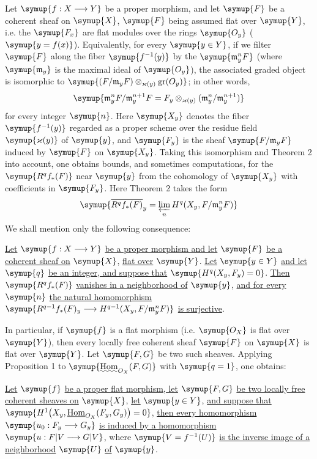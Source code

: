 Let $\symup{f:X\longrightarrow Y}$ be a proper morphism, and let $\symup{F}$ be a coherent
sheaf on $\symup{X}$, 
$\symup{F}$ being assumed flat over $\symup{Y}$, i.e. the $\symup{F_x}$ are flat modules over the
rings $\symup{O_y}$ ($\symup{y=f(x)}$). Equivalently, for every $\symup{y\in Y}$, if we filter $\symup{F}$
along the fiber $\symup{f^{-1}(y)}$ by the $\symup{\mathfrak m_y^nF}$ (where
$\symup{\mathfrak m_y}$ is the maximal ideal of $\symup{O_y}$), the associated graded
object is isomorphic to
$\symup{(F/\mathfrak m_yF)\otimes_{\varkappa(y)}\operatorname{gr}(O_y)}$; in other
words,
\[
  \symup{\mathfrak m_y^nF/\mathfrak m_y^{n+1}F
  =F_y\otimes_{\varkappa(y)}
  (\mathfrak m_y^n/\mathfrak m_y^{n+1})}
\]
for every integer $\symup{n}$. Here $\symup{X_y}$ denotes the fiber $\symup{f^{-1}(y)}$ regarded as a
proper scheme over the residue field $\symup{\varkappa(y)}$ of $\symup{y}$, and $\symup{F_y}$ is the
sheaf $\symup{F/\mathfrak m_yF}$ induced by $\symup{F}$ on $\symup{X_y}$. Taking this isomorphism and
Theorem 2 into account, one obtains bounds, and sometimes computations, for
the $\symup{R^qf_*(F)}$ near $\symup{y}$ from the cohomology of $\symup{X_y}$ with coefficients in
$\symup{F_y}$. Here Theorem 2 takes the form
\[
  \symup{\overline{R^qf_*(F)}_y
  =\varprojlim\limits_n H^q(X_y,F/\mathfrak m_y^nF)}
\]
We shall mention only the following consequence:


 \uline{Let} $\symup{f:X\longrightarrow Y}$ \uline{be a proper morphism and
let} $\symup{F}$ \uline{be a coherent sheaf on} $\symup{X}$, \uline{flat over} $\symup{Y}$. \uline{Let} $\symup{y\in Y}$ \uline{and let} $\symup{q}$
\uline{be an integer, and suppose that} $\symup{H^q(X_y,F_y)=0}$. \uline{Then} $\symup{R^qf_*(F)}$ \uline{vanishes in
a neighborhood of} $\symup{y}$, \uline{and for every} $\symup{n}$ \uline{the natural homomorphism}
$\symup{R^{q-1}f_*(F)_y\longrightarrow H^{q-1}(X_y,F/\mathfrak m_y^nF)}$
\uline{is surjective}.

In particular, if $\symup{f}$ is a flat morphism (i.e. $\symup{O_X}$ is flat over $\symup{Y}$),
then every locally free coherent sheaf $\symup{F}$ on $\symup{X}$ is flat over $\symup{Y}$. Let $\symup{F,G}$
be two such sheaves. Applying Proposition 1 to
$\symup{\mathop{\text{\uwave{Hom}}}\nolimits_{O_X}(F,G)}$ with $\symup{q=1}$, one obtains:

 \uline{Let} $\symup{f}$ \uline{be a proper flat morphism, let} $\symup{F,G}$ \uline{be two
locally free coherent sheaves on} $\symup{X}$, \uline{let} $\symup{y\in Y}$, \uline{and suppose that}
$\symup{H^1\bigl(X_y,\Homsh_{O_X}(F_y,G_y)\bigr)=0}$,
\uline{then every homomorphism} $\symup{u_0:F_y\longrightarrow G_y}$ \uline{is induced by a
homomorphism}
$\symup{u:F|V\longrightarrow G|V}$, where $\symup{V=f^{-1}(U)}$ \uline{is the inverse image of a
neighborhood} $\symup{U}$ \uline{of} $\symup{y}$.

